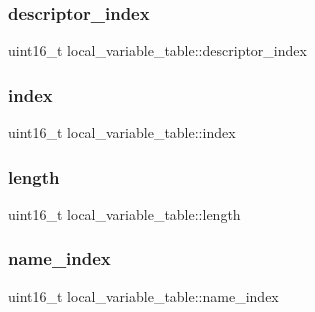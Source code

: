 \subsubsection{\texorpdfstring{descriptor\+\_\+index}{descriptor\_index}}
{\footnotesize\ttfamily uint16\+\_\+t local\+\_\+variable\+\_\+table\+::descriptor\+\_\+index}

\hypertarget{structlocal__variable__table_ad608d413d5436a35d55659d8a85fa6b0}{}\label{structlocal__variable__table_ad608d413d5436a35d55659d8a85fa6b0} 
\subsubsection{\texorpdfstring{index}{index}}
{\footnotesize\ttfamily uint16\+\_\+t local\+\_\+variable\+\_\+table\+::index}

\hypertarget{structlocal__variable__table_a24bf85b7ea3a81ec85153173706aec55}{}\label{structlocal__variable__table_a24bf85b7ea3a81ec85153173706aec55} 
\subsubsection{\texorpdfstring{length}{length}}
{\footnotesize\ttfamily uint16\+\_\+t local\+\_\+variable\+\_\+table\+::length}

\hypertarget{structlocal__variable__table_ae0c126d119eaace7f2393e173ea6fd2a}{}\label{structlocal__variable__table_ae0c126d119eaace7f2393e173ea6fd2a} 
\subsubsection{\texorpdfstring{name\+\_\+index}{name\_index}}
{\footnotesize\ttfamily uint16\+\_\+t local\+\_\+variable\+\_\+table\+::name\+\_\+index}

\hypertarget{structlocal__variable__table_a5d32f4a50c3486c460b638e236bc8fbe}{}\label{structlocal__variable__table_a5d32f4a50c3486c460b638e236bc8fbe} 
